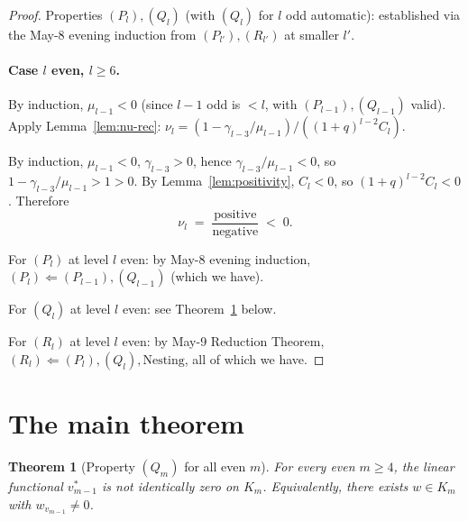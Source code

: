 \documentclass[11pt]{article}
\newtheorem{theorem}{Theorem}
\theoremstyle{definition}
\begin{document}
\begin{proof}
Properties $(P_l), (Q_l)$ (with $(Q_l)$ for $l$ odd automatic):
established via the May-8 evening induction from $(P_{l'}), (R_{l'})$
at smaller $l'$.

\paragraph{Case $l$ even, $l \ge 6$.}
By induction, $\mu_{l-1} < 0$ (since $l-1$ odd is $< l$, with
$(P_{l-1}), (Q_{l-1})$ valid).  Apply Lemma~\ref{lem:nu-rec}:
$\nu_l = (1 - \gamma_{l-3}/\mu_{l-1})/((1+q)^{l-2} C_l)$.

By induction, $\mu_{l-1} < 0$, $\gamma_{l-3} > 0$, hence $\gamma_{l-3}
/\mu_{l-1} < 0$, so $1 - \gamma_{l-3}/\mu_{l-1} > 1 > 0$.  By
Lemma~\ref{lem:positivity}, $C_l < 0$, so $(1+q)^{l-2} C_l < 0$.
Therefore
\[
   \nu_l \;=\; \frac{\text{positive}}{\text{negative}} \;<\; 0.
\]

For $(P_l)$ at level $l$ even: by May-8 evening induction,
$(P_l) \Leftarrow (P_{l-1}), (Q_{l-1})$ (which we have).

For $(Q_l)$ at level $l$ even: see Theorem~\ref{thm:Q-main} below.

For $(R_l)$ at level $l$ even: by May-9 Reduction Theorem,
$(R_l) \Leftarrow (P_l), (Q_l), \text{Nesting}$, all of which we
have.
\end{proof}

\section{The main theorem}\label{sec:main}

\begin{theorem}[Property $(Q_m)$ for all even $m$]\label{thm:Q-main}
For every even $m \ge 4$, the linear functional $v_{m-1}^*$ is not
identically zero on $K_m$.  Equivalently, there exists $w \in K_m$
with $w_{v_{m-1}} \neq 0$.
\end{theorem}
\end{document}
